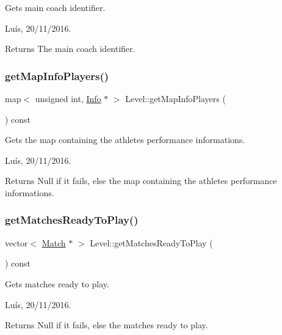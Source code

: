 Gets main coach identifier. 

Luís, 20/11/2016. 

\begin{DoxyReturn}{Returns}
The main coach identifier. 
\end{DoxyReturn}
\hypertarget{class_level_a3d4498069e112cbdc952ce1c9e5eb6a5}{}\label{class_level_a3d4498069e112cbdc952ce1c9e5eb6a5} 
\subsubsection{\texorpdfstring{get\+Map\+Info\+Players()}{getMapInfoPlayers()}}
{\footnotesize\ttfamily map$<$ unsigned int, \hyperlink{class_info}{Info} $\ast$ $>$ Level\+::get\+Map\+Info\+Players (\begin{DoxyParamCaption}{ }\end{DoxyParamCaption}) const}



Gets the map containing the athletes performance informations. 

Luís, 20/11/2016. 

\begin{DoxyReturn}{Returns}
Null if it fails, else the map containing the athletes performance informations. 
\end{DoxyReturn}
\hypertarget{class_level_af1da9db30e4e0d350fb72ca7c844958c}{}\label{class_level_af1da9db30e4e0d350fb72ca7c844958c} 
\subsubsection{\texorpdfstring{get\+Matches\+Ready\+To\+Play()}{getMatchesReadyToPlay()}}
{\footnotesize\ttfamily vector$<$ \hyperlink{class_match}{Match} $\ast$ $>$ Level\+::get\+Matches\+Ready\+To\+Play (\begin{DoxyParamCaption}{ }\end{DoxyParamCaption}) const}



Gets matches ready to play. 

Luís, 20/11/2016. 

\begin{DoxyReturn}{Returns}
Null if it fails, else the matches ready to play. 
\end{DoxyReturn}
\hypertarget{class_level_ae034a3eb28a90653820eb9633b9f7464}{}\label{class_level_ae034a3eb28a90653820eb9633b9f7464} 
